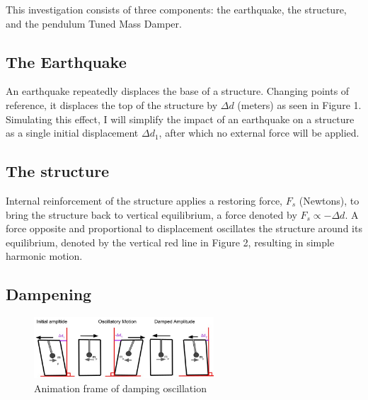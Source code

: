 \documentclass{article}
\begin{document}
This investigation consists of three components: the earthquake, the structure, and the pendulum Tuned Mass Damper.

\subsection{The Earthquake}

An earthquake repeatedly displaces the base of a structure. Changing points of reference, it displaces the top of the structure by $\Delta d$ (meters) as seen in Figure 1. Simulating this effect, I will simplify the impact of an earthquake on a structure as a single initial displacement $\Delta d_1$, after which no external force will be applied.


\subsection{The structure}

Internal reinforcement of the structure applies a restoring force, $F_s$ (Newtons), to bring the structure back to vertical equilibrium, a force denoted by $F_s \propto -\Delta d$. A force opposite and proportional to displacement oscillates the structure around its equilibrium, denoted by the vertical red line in Figure 2, resulting in simple harmonic motion. 



\subsection{Dampening}

\begin{figure}
\centering
\includegraphics[width=0.6\textwidth]{img/fig2.jpg}
\caption{\label{fig:2}Animation frame of damping oscillation}
\vspace{-10pt}
\end{figure}
\end{document}
